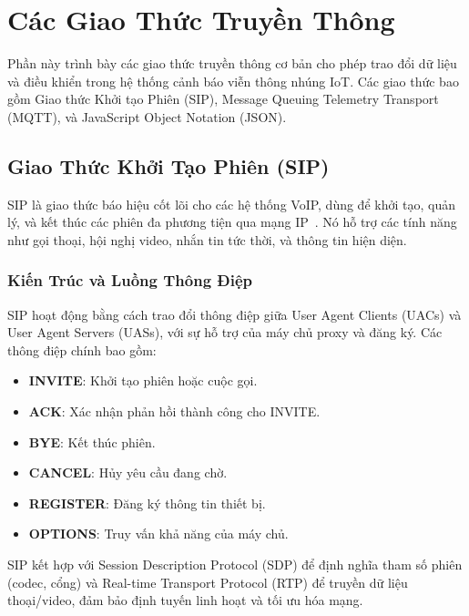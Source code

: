 \section{Các Giao Thức Truyền Thông}
\label{sec:communication_protocols}

Phần này trình bày các giao thức truyền thông cơ bản cho phép trao đổi dữ liệu và điều khiển trong hệ thống cảnh báo viễn thông nhúng IoT. Các giao thức bao gồm Giao thức Khởi tạo Phiên (SIP), Message Queuing Telemetry Transport (MQTT), và JavaScript Object Notation (JSON).

\subsection{Giao Thức Khởi Tạo Phiên (SIP)}
\label{subsec:sip_protocol}

SIP là giao thức báo hiệu cốt lõi cho các hệ thống VoIP, dùng để khởi tạo, quản lý, và kết thúc các phiên đa phương tiện qua mạng IP~\cite{sip_rfc3261}. Nó hỗ trợ các tính năng như gọi thoại, hội nghị video, nhắn tin tức thời, và thông tin hiện diện.

\subsubsection{Kiến Trúc và Luồng Thông Điệp}
\label{subsubsec:sip_architecture}

SIP hoạt động bằng cách trao đổi thông điệp giữa User Agent Clients (UACs) và User Agent Servers (UASs), với sự hỗ trợ của máy chủ proxy và đăng ký. Các thông điệp chính bao gồm:

\begin{itemize}
    \item \textbf{INVITE}: Khởi tạo phiên hoặc cuộc gọi.
    \item \textbf{ACK}: Xác nhận phản hồi thành công cho INVITE.
    \item \textbf{BYE}: Kết thúc phiên.
    \item \textbf{CANCEL}: Hủy yêu cầu đang chờ.
    \item \textbf{REGISTER}: Đăng ký thông tin thiết bị.
    \item \textbf{OPTIONS}: Truy vấn khả năng của máy chủ.
\end{itemize}

SIP kết hợp với Session Description Protocol (SDP) để định nghĩa tham số phiên (codec, cổng) và Real-time Transport Protocol (RTP) để truyền dữ liệu thoại/video, đảm bảo định tuyến linh hoạt và tối ưu hóa mạng.

